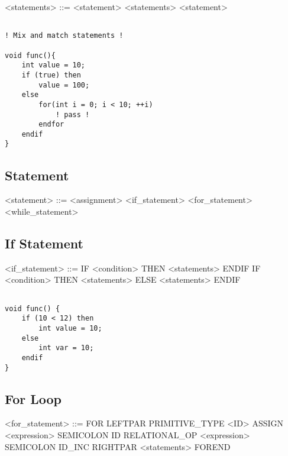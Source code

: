 \documentclass{article}
\begin{document}
\begin{grammar}
<statements> ::= <statement> <statements>
\alt <statement>
\end{grammar}

\begin{lstlisting}[style=CStyle]

! Mix and match statements !

void func(){
    int value = 10;
    if (true) then
        value = 100;
    else
        for(int i = 0; i < 10; ++i) 
            ! pass !
        endfor
    endif
}

\end{lstlisting}

\subsection{Statement}

\begin{grammar}
<statement> ::= <assignment>
\alt <if\_statement>
\alt <for\_statement>
\alt <while\_statement>

\end{grammar}

\subsection{If Statement}

\begin{grammar}
<if\_statement> ::= IF <condition> THEN <statements> ENDIF
\alt IF <condition> THEN <statements> ELSE <statements> ENDIF

\end{grammar}

\begin{lstlisting}[style=CStyle]

void func() {
    if (10 < 12) then
        int value = 10;
    else
        int var = 10;
    endif
}

\end{lstlisting}

\newpage

\subsection{For Loop}

\begin{grammar}
<for\_statement> ::= FOR LEFTPAR PRIMITIVE\_TYPE <ID> ASSIGN <expression> SEMICOLON ID RELATIONAL\_OP <expression> SEMICOLON ID\_INC RIGHTPAR <statements> FOREND
\end{grammar}
\end{document}
